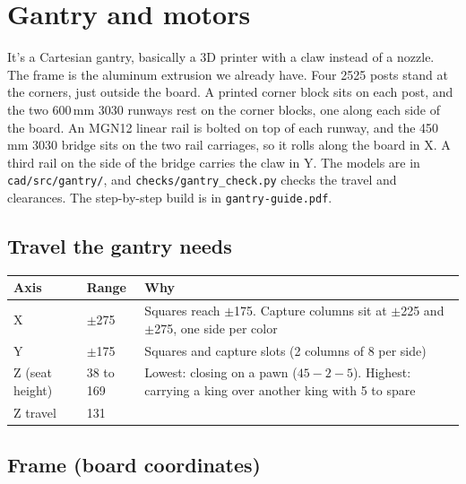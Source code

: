 \documentclass[10pt]{article}
\newcommand{\mm}{\,mm}
\newcommand{\file}[1]{\texttt{#1}}
\begin{document}
\section{Gantry and motors}

It's a Cartesian gantry, basically a 3D printer with a claw instead of a nozzle. The frame is
the aluminum extrusion we already have. Four 2525 posts stand at the corners, just outside the
board. A printed corner block sits on each post, and the two 600\mm{} 3030 runways rest on the
corner blocks, one along each side of the board. An MGN12 linear rail is bolted on top of each
runway, and the 450\mm{} 3030 bridge sits on the two rail carriages, so it rolls along the board
in X. A third rail on the side of the bridge carries the claw in Y. The models are in
\file{cad/src/gantry/}, and \file{checks/gantry\_check.py} checks the travel and clearances.
The step-by-step build is in \file{gantry-guide.pdf}.

\subsection{Travel the gantry needs}

\begin{tabularx}{\textwidth}{l l L}
\toprule
Axis & Range & Why \\
\midrule
X & $\pm$275 & Squares reach $\pm$175. Capture columns sit at $\pm$225 and $\pm$275, one side per color \\
Y & $\pm$175 & Squares and capture slots (2 columns of 8 per side) \\
Z (seat height) & 38 to 169 & Lowest: closing on a pawn ($45 - 2 - 5$). Highest: carrying a king over another king with 5 to spare \\
Z travel & 131 & \\
\bottomrule
\end{tabularx}

\subsection{Frame (board coordinates)}
\end{document}
